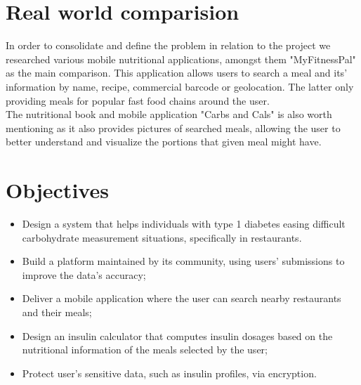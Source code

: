 \newpage
\section{Real world comparision}

In order to consolidate and define the problem in relation to the project we
researched various mobile nutritional applications, amongst them "MyFitnessPal" as the main comparison.
This application allows users to search a meal and its' information by name, recipe, commercial barcode or geolocation. The latter
only providing meals for popular fast food chains around the user.\\

The nutritional book and mobile application "Carbs and Cals" is also worth mentioning as it also provides pictures 
of searched meals, allowing the user to better understand and visualize the portions that given meal might have.

\section{Objectives}

\begin{itemize}
    \item Design a system that helps individuals with type 1 diabetes easing difficult carbohydrate measurement situations, specifically in restaurants.
    \item Build a platform maintained by its community, using users' submissions to improve the data's accuracy;
    \item Deliver a mobile application where the user can search nearby restaurants and their meals;
    \item Design an insulin calculator that computes insulin dosages based on the nutritional information of the meals selected by the user;
    \item Protect user's sensitive data, such as insulin profiles, via encryption.
\end{itemize}